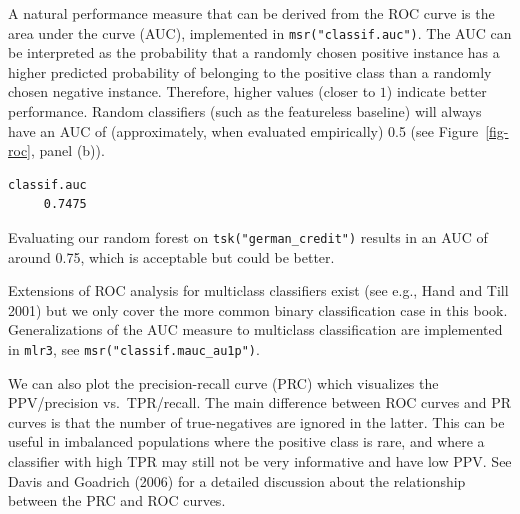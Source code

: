 A natural performance measure that can be derived from the ROC curve is
the area under the curve (AUC), implemented in
\texttt{msr("classif.auc")}. The AUC can be interpreted as the
probability that a randomly chosen positive instance has a higher
predicted probability of belonging to the positive class than a randomly
chosen negative instance. Therefore, higher values (closer to \(1\))
indicate better performance. Random classifiers (such as the featureless
baseline) will always have an AUC of (approximately, when evaluated
empirically) 0.5 (see Figure~\ref{fig-roc}, panel (b)).

\begin{Shaded}
\begin{Highlighting}[]
\SpecialCharTok{$}\NormalTok{(}\NormalTok{(}\NormalTok{))}
\end{Highlighting}
\end{Shaded}

\begin{verbatim}
classif.auc 
     0.7475 
\end{verbatim}

Evaluating our random forest on \texttt{tsk("german\_credit")} results
in an AUC of around 0.75, which is acceptable but could be better.

\begin{tcolorbox}[enhanced jigsaw, opacitybacktitle=0.6, rightrule=.15mm, opacityback=0, arc=.35mm, breakable, titlerule=0mm, colframe=quarto-callout-tip-color-frame, coltitle=black, bottomrule=.15mm, toprule=.15mm, colback=white, colbacktitle=quarto-callout-tip-color!10!white, bottomtitle=1mm, toptitle=1mm, title=\textcolor{quarto-callout-tip-color}{\faLightbulb}\hspace{0.5em}{Multiclass ROC and AUC}, leftrule=.75mm, left=2mm]

Extensions of ROC analysis for multiclass classifiers exist (see e.g.,
Hand and Till 2001) but we only cover the more common binary
classification case in this book. Generalizations of the AUC measure to
multiclass classification are implemented in \texttt{mlr3}, see
\texttt{msr("classif.mauc\_au1p")}.

\end{tcolorbox}

We can also plot the precision-recall
curve (PRC) which visualizes the
PPV/precision
vs.~TPR/recall. The main difference between
ROC curves and PR curves is that the number of true-negatives are
ignored in the latter. This can be useful in imbalanced populations
where the positive class is rare, and where a classifier with high TPR
may still not be very informative and have low PPV. See Davis and
Goadrich (2006) for a detailed discussion about the relationship between
the PRC and ROC curves.

